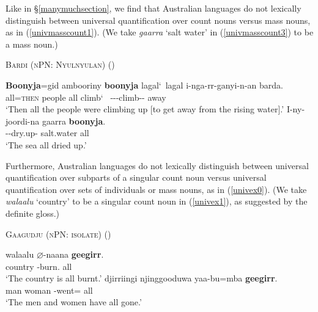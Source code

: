 \documentclass[12pt,egregdoesnotlikesansseriftitles]{scrartcl}
\begin{document}
Like in \S\ref{manymuchsection}, we find that Australian languages do not lexically distinguish between universal quantification over count nouns versus mass nouns, as in (\ref{univmasscount1}). (We take \textit{gaarra} `salt water' in (\ref{univmasscount3}) to be a mass noun.)
\begin{exe}
  \ex \textsc{Bardi (nPN: Nyulnyulan)} \hfill(\citealt[272, 710]{bowern12}) \label{univmasscount1}
  \begin{xlist}
    \ex %
    \gll \textbf{Boonyja}=gid ambooriny \textbf{boonyja} lagal\char`~lagal i-nga-rr-ganyi-n-an barda.\\
    all=\textsc{then} people all climb\char`~\Rdp{}  \Third-\Pst-\Aug-climb-\Cont-\Rempst{} away\\
    \glt `Then all the people were climbing up [to get away from the rising water].'\label{univmasscount2}
    \ex \gll I-ny-joordi-na gaarra \textbf{boonyja}.\\
    \Third\M-\Pst-dry.up-\Rempst{} salt.water all\\
    \glt `The sea all dried up.'\label{univmasscount3} %
  \end{xlist}
\end{exe}

Furthermore,  Australian languages  do not lexically distinguish between universal quantification  over subparts of a singular count noun versus universal quantification over sets of individuals or mass nouns, as in (\ref{univex0}). (We take \textit{walaalu} `country' to be a singular count noun in (\ref{univex1}), as suggested by the definite gloss.)
\begin{exe}
 \ex \textsc{Gaagudju (nPN: isolate)} \hfill (\citealt[307]{harvey92}) \label{univex0}
  \begin{xlist}
      \ex \gll walaalu $\varnothing$-naana \textbf{geegirr}.\\
    country \Cliv-burn.\Pp{} all\\
    \glt `The country is all burnt.' \label{univex1}
    \ex \gll djirriingi njinggooduwa yaa-bu=mba \textbf{geegirr}.\\
    man woman \Third\Cli-went=\Aug{} all\\
    \glt `The men and women have all gone.' \label{univex2}
  \end{xlist}
\end{exe}
\end{document}
